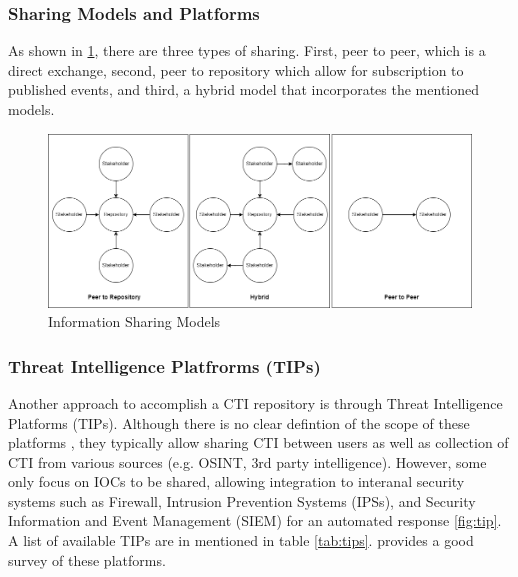 \subsubsection{Sharing Models and Platforms}

As shown in \ref{fig:sharing-models}, there are three types of sharing. First, peer to peer, which is a direct exchange, second, peer to repository which allow for subscription to published events, and third, a hybrid model that incorporates the mentioned models.

\begin{figure}[ht]
    \centering
    \includegraphics[width=\textwidth]{diagrams/background/sharing_models.png}
    \caption{Information Sharing Models \cite{wagner_cyber_2019}}
    \label{fig:sharing-models}
\end{figure}

\subsubsection{Threat Intelligence Platfrorms (TIPs)}
Another approach to accomplish a CTI repository is through Threat Intelligence Platforms (TIPs). Although there is no clear defintion of the scope of these platforms \cite{sauerwein_threat_2017}, they typically allow sharing CTI between users as well as collection of CTI from various sources (e.g. OSINT, 3rd party intelligence). However, some only focus on IOCs to be shared, allowing integration to interanal security systems such as Firewall, Intrusion Prevention Systems (IPSs), and Security Information and Event Management (SIEM) for an automated response \ref{fig:tip}. A list of available TIPs are in mentioned in table \ref{tab:tips}. \cite{sauerwein_threat_2017} provides a good survey of these platforms.


